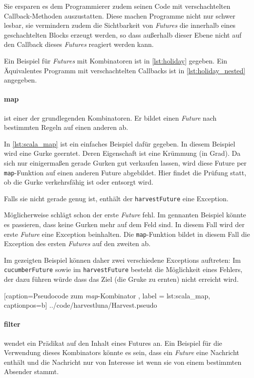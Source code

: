 Sie ersparen es dem Programmierer zudem seinen Code mit verschachtelten
Callback-Methoden auszustatten. Diese machen Programme nicht nur
schwer lesbar, sie vermindern zudem die Sichtbarkeit von \emph{Futures}
die innerhalb eines geschachtelten Blocks erzeugt werden, so dass
außerhalb dieser Ebene nicht auf den Callback dieses \emph{Futures}
reagiert werden kann.

Ein Beispiel für \emph{Futures} mit Kombinatoren ist in \ref{lst:holiday}
gegeben. Ein Äquivalentes Programm mit verschachtelten Callbacks
ist in \ref{lst:holiday_nested} angegeben.

\paragraph{map} ist einer der grundlegenden Kombinatoren. Er bildet
einen \emph{Future} nach bestimmten Regeln auf einen anderen ab.

In \ref{lst:scala_map} ist ein einfaches Beispiel dafür gegeben.
In diesem Beispiel wird eine Gurke geerntet. Deren Eigenschaft ist eine
Krümmung (in Grad). Da sich nur einigermaßen gerade
Gurken gut verkaufen lassen, wird diese Future per \texttt{map}-Funktion
auf einen anderen Future abgebildet. Hier findet die Prüfung statt, ob
die Gurke verkehrsfähig ist oder entsorgt wird.

Falls sie nicht gerade genug ist, enthält der \texttt{harvestFuture}
eine Exception.

Möglicherweise schlägt schon der erste \emph{Future} fehl. Im gennanten
Beispiel könnte es passieren, dass keine Gurken mehr auf dem Feld sind.
In diesem Fall wird der erste \emph{Future} eine Exception beinhalten.
Die \texttt{map}-Funktion bildet in diesem Fall die Exception des
ersten \emph{Futures} auf den zweiten ab.

Im gezeigten Beispiel können daher zwei verschiedene Exceptions auftreten:
Im \texttt{cucumberFuture} sowie im \texttt{harvestFuture} besteht
die Möglichkeit eines Fehlers, der dazu führen würde dass das Ziel
(die Gruke zu ernten) nicht erreicht wird.


    [caption={Pseudocode zum \emph{map}-Kombinator },
       label = lst:scala_map,
       captionpos=b]
 {../code/harvestluna/Harvest.pseudo}
 
\paragraph{filter} wendet ein Prädikat auf den Inhalt eines Futures
an. Ein Beispiel für die Verwendung dieses Kombinators könnte es sein,
dass ein \emph{Future} eine Nachricht enthält und die Nachricht nur
von Interesse ist wenn sie von einem bestimmten Absender stammt.

